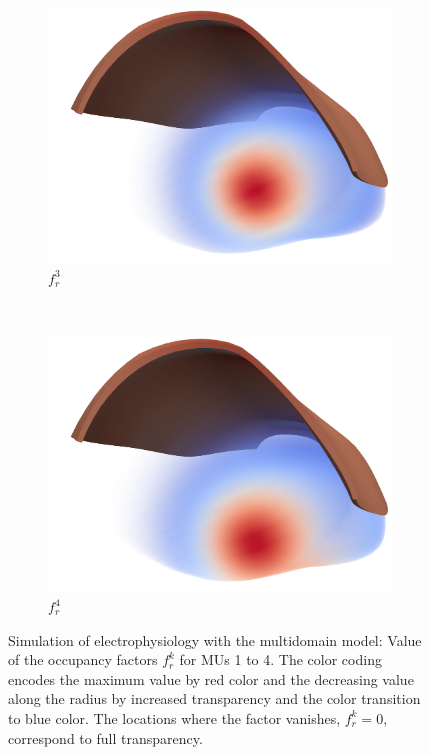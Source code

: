 \begin{figure}
\begin{subfigure}[t]{0.23\textwidth}
    \centering%
    \includegraphics[width=\textwidth]{images/results/application/multidomain_fr2_cropped.png}%
    \caption{$f_r^3$}%
    \label{fig:fr2}%
  \end{subfigure}
  \,
  \begin{subfigure}[t]{0.23\textwidth}%
    \centering%
    \includegraphics[width=\textwidth]{images/results/application/multidomain_fr3_cropped.png}%
    \caption{$f_r^4$}%
    \label{fig:fr3}%
  \end{subfigure}
  \caption{Simulation of electrophysiology with the multidomain model: Value of the occupancy factors $f_r^k$ for MUs 1 to 4. The color coding encodes the maximum value by red color and the decreasing value along the radius by increased transparency and the color transition to blue color. The locations where the factor vanishes, $f_r^k=0$, correspond to full transparency.}%
  \label{fig:multidomain_fr}%
\end{figure}%

